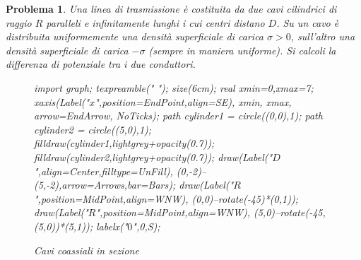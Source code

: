 \documentclass[a4paper,oneside]{article}
\newtheorem{problema}{Problema}
\let\oldhat\hat
\renewcommand{\vec}[1]{\mathbf{#1}}
\renewcommand{\hat}[1]{\widehat{\mathbf{#1}}}
\begin{document}
\begin{problema}
	Una linea di trasmissione è costituita da due cavi cilindrici	 di raggio $R$ paralleli
	e infinitamente lunghi i cui centri distano $D$. Su un cavo è distribuita uniformemente
	una densità superficiale di carica $\sigma > 0$, sull'altro una densità superficiale di 
	carica $-\sigma$ (sempre in maniera uniforme). Si calcoli la differenza di potenziale tra
	i due conduttori.
	\begin{figure}[H]
			\centering
			\begin{asy}
				import graph;
				texpreamble("\let\oldhat\hat
				\renewcommand{\vec}[1]{\mathbf{#1}}
				\renewcommand{\hat}[1]{\oldhat{\mathbf{#1}}}");
				size(6cm);
				real xmin=0,xmax=7;
				xaxis(Label("\small $x$",position=EndPoint,align=SE),
				xmin, xmax, arrow=EndArrow, NoTicks);
				path cylinder1 = circle((0,0),1);
				path cylinder2 = circle((5,0),1);
				filldraw(cylinder1,lightgrey+opacity(0.7));
				filldraw(cylinder2,lightgrey+opacity(0.7));
				draw(Label("\small $D$",align=Center,filltype=UnFill),
				(0,-2)--(5,-2),arrow=Arrows,bar=Bars);
				draw(Label("\small $R$",position=MidPoint,align=WNW),
				(0,0)--rotate(-45)*(0,1));
				draw(Label("\small $R$",position=MidPoint,align=WNW),
				(5,0)--rotate(-45,(5,0))*(5,1));
				labelx("\small $0$",0,S);
			\end{asy}
			\caption{Cavi coassiali in sezione}
			\label{fig:cavi_coassiali_sezione}
		\end{figure}
\end{problema}
\end{document}
